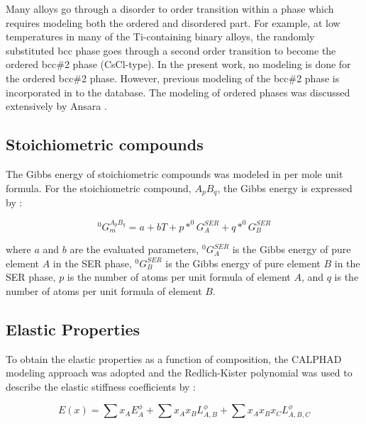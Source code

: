 Many alloys go through a disorder to order transition within a phase which requires modeling both the ordered and disordered part. For example, at low temperatures in many of the Ti-containing binary alloys, the randomly substituted bcc phase goes through a second order transition to become the ordered bcc\#2 phase (CsCl-type). In the present work, no modeling is done for the ordered bcc\#2 phase. However, previous modeling of the bcc\#2 phase is incorporated in to the database. The modeling of ordered phases was discussed extensively by Ansara \cite{Ansara1998}.

\subsection{Stoichiometric compounds}

The Gibbs energy of stoichiometric compounds was modeled in per mole unit formula. For the stoichiometric compound, $A_{p}B_{q}$, the Gibbs energy is expressed by \cite{Zacherl2012}: 

\begin{equation}
\label{eq: stoichiometric}
^{0}G_{m}^{A_{p}B_{q}} = a + bT + p * ^{0}G_{A}^{SER} + q * ^{0}G_{B}^{SER}
\end{equation}

\noindent where $a$ and $b$ are the evaluated parameters, $^{0}G_{A}^{SER}$ is the Gibbs energy of pure element $A$ in the SER phase, $^{0}G_{B}^{SER}$ is the Gibbs energy of pure element $B$ in the SER phase, $p$ is the number of atoms per unit formula of element $A$, and $q$ is the number of atoms per unit formula of element $B$.

\subsection{Elastic Properties}

To obtain the elastic properties as a function of composition, the CALPHAD modeling approach was adopted and the Redlich-Kister polynomial was used to describe the elastic stiffness coefficients by \cite{Redlich1948b,Liu2009,Lukas2007,Liu2010}: 

\begin{equation}
\label{eq: elastic}
E(x) = \sum x_{A} E_{A}^{\phi} + \sum x_{A} x_{B}  L_{A,B}^{\phi} + \sum x_{A} x_{B} x_{C}  L_{A, B, C}^{\phi}
\end{equation}


